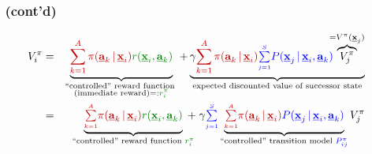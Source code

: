 \begin{frame}\frametitle{\subsecname~(cont'd)}

\slidesonly{\vspace{-5mm}}



\pause

\slidesonly{\vspace{-10mm}}

	\begin{align}
		V^\pi_i 
		&=& \underbrace{
		{\color{policy} \sum_{k=1}^A \pi(\vec a_k \,|\, \vec x_i)}
			 {\color{reward} r(\vec x_i, \vec a_k)}
			 }_{\substack{\text{``controlled'' reward function }\\
			 \text{(immediate reward)} =: {\color{reward} r_i^\pi}}
			 }
			+ \underbrace{
			\gamma {\color{policy} \sum_{k=1}^A \pi(\vec a_k \,|\, \vec x_i)} {\color{trans}\smallsum{j=1}{S} 
				P(\vec x_j \,|\, \vec x_i, \vec a_k)} \kern-1.2ex
				\overbrace{V^\pi_j}^{=V^\pi(\vec x_j)}
				}_{\text{expected discounted value of successor state}} \\
		&=& 
			\underbrace{{\color{policy} \smallsum{k=1}A 
				\pi(\vec a_k \,|\, \vec x_i)} 
				{\color{reward} r(\vec x_i, \vec a_k)}
			}_{\kern-4ex\text{``controlled'' reward function }
					{\color{reward} r_i^\pi}\kern-4ex}
			\;+\; \gamma {\color{trans} \smallsum{j=1}{S}}
			\underbrace{
				{\color{policy} \smallsum{k=1}A 
				\pi(\vec a_k \,|\, \vec x_i)} 
				{\color{trans} P(\vec x_j \,|\, \vec x_i, \vec a_k)}
			}_{\text{``controlled'' transition model }
					{\color{trans} P^\pi_{ij}}}  V^\pi_j
	\end{align}
	
	
	
\end{frame}

